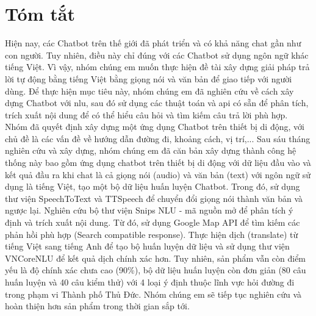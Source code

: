 \chapter*{Tóm tắt}
\label{tomtat}
Hiện nay, các Chatbot trên thế giới đã phát triển và có khả năng chat gần như con người. Tuy nhiên, điều này chỉ đúng với các Chatbot sử dụng ngôn ngữ khác tiếng Việt. Vì vậy, nhóm chúng em muốn thực hiện đề tài xây dựng giải pháp trả lời tự động bằng tiếng Việt bằng giọng nói và văn bản để giao tiếp với người dùng. Để thực hiện mục tiêu này, nhóm chúng em đã nghiên cứu về cách xây dựng Chatbot với \ac{nlu}, sau đó sử dụng các thuật toán và \ac{api} có sẵn để phân tích, trích xuất nội dung để có thể hiểu câu hỏi và tìm kiếm câu trả lời phù hợp. Nhóm đã quyết định xây dựng một ứng dụng Chatbot trên thiết bị di động, với chủ đề là các vấn đề về hướng dẫn đường đi, khoảng cách, vị trí,... Sau sáu tháng nghiên cứu và xây dựng, nhóm chúng em đã căn bản xây dựng thành công hệ thống này bao gồm ứng dụng chatbot trên thiết bị di động với dữ liệu đầu vào và kết quả đầu ra khi chat là cả giọng nói (audio) và văn bản (text) với ngôn ngữ sử dụng là tiếng Việt, tạo một bộ dữ liệu huấn luyện Chatbot. Trong đó, sử dụng thư viện SpeechToText\cite{stt} và TTSpeech\cite{tts} để chuyển đổi giọng nói thành văn bản và ngược lại. Nghiên cứu bộ thư viện Snips NLU\cite{Snipsnlu} - mã nguồn mở để phân tích ý định và trích xuất nội dung. Từ đó, sử dụng Google Map API\cite{ggmaps} để tìm kiếm các phản hồi phù hợp (Search compatible response). Thực hiện dịch (translate) từ tiếng Việt sang tiếng Anh để tạo bộ huấn luyện dữ liệu và sử dụng thư viện VNCoreNLU\cite{vncorenlu} để kết quả dịch chính xác hơn. Tuy nhiên, sản phẩm vẫn còn điểm yếu là độ chính xác chưa cao (90\%), bộ dữ liệu huấn luyện còn đơn giản (80 câu huấn luyện và 40 câu kiểm thử) với 4 loại ý định thuộc lĩnh vực hỏi đường đi trong phạm vi Thành phố Thủ Đức. Nhóm chúng em sẽ tiếp tục nghiên cứu và hoàn thiện hơn sản phẩm trong thời gian sắp tới. 

